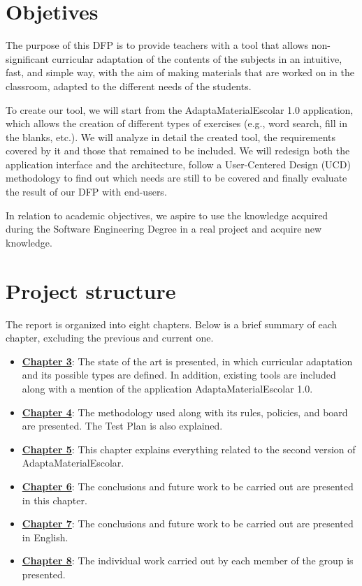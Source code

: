 \section{Objetives}\label{cap:objetives}
The purpose of this DFP is to provide teachers with a tool that allows non-significant curricular adaptation of the contents of the subjects in an intuitive, fast, and simple way, with the aim of making materials that are worked on in the classroom, adapted to the different needs of the students.

To create our tool, we will start from the AdaptaMaterialEscolar 1.0 application, which allows the creation of different types of exercises (e.g., word search, fill in the blanks, etc.). We will analyze in detail the created tool, the requirements covered by it and those that remained to be included. We will redesign both the application interface and the architecture, follow a  User-Centered Design (UCD) methodology to find out which needs are still to be covered and finally evaluate the result of our DFP with end-users.

In relation to academic objectives, we aspire to use the knowledge acquired during the Software Engineering Degree in a real project and acquire new knowledge. 

\section{Project structure}\label{cap:Projectstructure}
The report is organized into eight chapters. Below is a brief summary of each chapter, excluding the previous and current one.
\begin{itemize}
\item \textbf{\hyperref[cap:estadoDelArte]{Chapter 3}}: The state of the art is presented, in which curricular adaptation and its possible types are defined. In addition, existing tools are included along with a mention of the application AdaptaMaterialEscolar 1.0.
\item \textbf{\hyperref[cap:metodologia]{Chapter 4}}: The methodology used along with its rules, policies, and board are presented. The Test Plan is also explained.
\item \textbf{\hyperref[cap:AdaptaMaterialEscolar2.0]{Chapter 5}}: This chapter explains everything related to the second version of AdaptaMaterialEscolar.
\item \textbf{\hyperref[cap:conclusiones]{Chapter 6}}: The conclusions and future work to be carried out are presented in this chapter.
\item \textbf{\hyperref[cap:conclusions]{Chapter 7}}: The conclusions and future work to be carried out are presented in English.
\item \textbf{\hyperref[cap:TrabajoIndividual]{Chapter 8}}: The individual work carried out by each member of the group is presented.
\end{itemize}